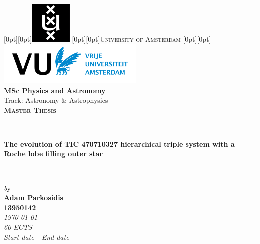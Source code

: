 \begin{titlepage}

\newcommand{\HRule}{\rule{\linewidth}{0.8mm}}
\center
 \vspace*{0.5cm}  %
\raisebox{0.05cm}[0pt][0pt]{\includegraphics[width=2.0cm]{Thesis/logos/UvA_logo.png}}
\raisebox{0.7cm}[0pt][0pt]{\textsc{\Huge University of Amsterdam}}
\raisebox{-1.85cm}[0pt][0pt]{\includegraphics[width=7.0cm]{Thesis/logos/VUlogo.png}}\\[2.0 cm]

\Large{\textbf{MSc Physics and Astronomy}}\\%
\Large{Track: Astronomy \& Astrophysics}\\[0.7cm] %
\textsc{\Large \textbf{Master Thesis}}\\[0.2cm]


\HRule \\[0.3cm]

{ \huge \bfseries The evolution of TIC 470710327 hierarchical triple system with a Roche lobe filling outer star }\\[0.8cm] %

\HRule \\[0.7cm]
 

{\Large \emph by}\\[0.6cm]
{\Large \bfseries Adam Parkosidis\\ %
13950142}\\[0.4cm] %
{\large  \emph{\today}}\\ %
{\large  \emph{60 ECTS}}\\ %
{\large  \emph{Start date - End date}}\\[1.8cm] %


\end{titlepage}
